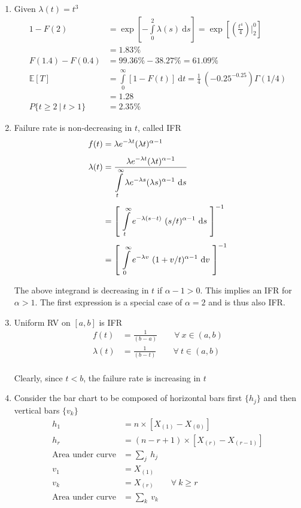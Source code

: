 \begin{enumerate}
	\item Given \(\lambda (t) = t^3\)
	\begin{align}
		1 - F(2) &= \exp \left[ -\int\limits_0^2 \lambda(s) \ \mathrm{d}s \right] =  \exp \left[ \left( \frac{t^4}{4} \right) \Big|_2^0 \right] \nonumber \\
		&= 1.83\% \\
		F(1.4) - F(0.4) &= 99.36\% - 38.27\% = 61.09\% \\
		\mathbb{E}[T] &= \int\limits_0^\infty \left[ 1 - F(t) \right]\ \mathrm{d}t = \frac{1}{4}\ (-0.25^{-0.25}) \Gamma(1/4) \nonumber\\
		&= 1.28 \\
		P \{t \geq 2 \ |\ t > 1\} &= 2.35\%
	\end{align}

	\item Failure rate is non-decreasing in \(t\), called IFR
	\begin{align}
		f(t) &= \lambda e^{-\lambda t} (\lambda t)^{\alpha - 1} \nonumber\\[1ex]
		\lambda (t) &= \frac{\displaystyle \lambda e^{-\lambda t} (\lambda t)^{\alpha - 1}}{\displaystyle \int\limits_t^{\infty} \lambda e^{-\lambda s} (\lambda s)^{\alpha - 1} \ \mathrm{d}s} \\[1ex]
		&= \left[ \ \int\limits_t^{\infty} e^{-\lambda (s-t)} \ (s/t)^{\alpha - 1}\ \mathrm{d}s \ \right]^{-1} \\[1ex]
		&= \left[ \ \int\limits_0^{\infty} e^{-\lambda v} \ (1 + v/t)^{\alpha - 1}\ \mathrm{d}v \ \right]^{-1}
	\end{align}

	The above integrand is decreasing in \(t\) if \(\alpha - 1 > 0\). This implies an IFR for \(\alpha > 1\). The first expression is a special case of \(\alpha = 2\) and is thus also IFR.

	\item Uniform RV on \([a, b]\) is IFR
	\begin{align}
		f(t) &= \frac{1}{(b-a)} \qquad \forall \ x \in (a, b) \nonumber\\[1ex]
		\lambda (t) &= \frac{1}{(b-t)}  \qquad \forall \ t \in (a, b) \\[1ex]
	\end{align}

	Clearly, since \(t < b\), the failure rate is increasing in \(t\)

	\item Consider the bar chart to be composed of horizontal bars first \(\{h_j\}\) and then vertical bars \(\{v_k\}\)
	\begin{align}
		h_1 &= n \times \left[ X_{(1)} - X_{(0)} \right] \nonumber \\
		h_r &= (n-r+1) \times \left[ X_{(r)} - X_{(r-1)} \right] \nonumber \\
		\text{Area under curve} &= \sum_j\ h_j \\
		v_1 &= X_{(1)} \nonumber \\
		v_k &= X_{(r)} \qquad \forall \ k \geq r \nonumber \\
		\text{Area under curve} &= \sum_k\ v_k \\
	\end{align}


\end{enumerate}
